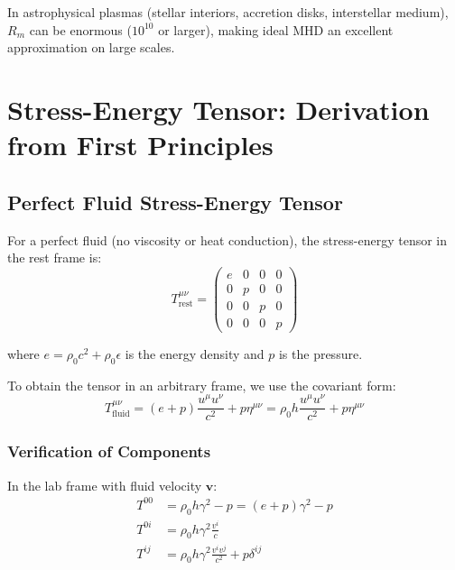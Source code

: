 \documentclass[12pt,a4paper]{article}
\begin{document}
In astrophysical plasmas (stellar interiors, accretion disks, interstellar medium),
$R_m$ can be enormous ($10^{10}$ or larger), making ideal MHD an excellent approximation
on large scales.

\section{Stress-Energy Tensor: Derivation from First Principles}

\subsection{Perfect Fluid Stress-Energy Tensor}

For a perfect fluid (no viscosity or heat conduction), the stress-energy tensor
in the rest frame is:
\begin{equation}
T^{\mu\nu}_\text{rest} = \begin{pmatrix}
e & 0 & 0 & 0 \\
0 & p & 0 & 0 \\
0 & 0 & p & 0 \\
0 & 0 & 0 & p
\end{pmatrix}
\label{eq:Tmunu_rest}
\end{equation}

where $e = \rho_0 c^2 + \rho_0 \epsilon$ is the energy density and $p$ is the pressure.

To obtain the tensor in an arbitrary frame, we use the covariant form:
\begin{equation}
T^{\mu\nu}_\text{fluid} = (e + p)\frac{u^\mu u^\nu}{c^2} + p \eta^{\mu\nu}
= \rho_0 h \frac{u^\mu u^\nu}{c^2} + p \eta^{\mu\nu}
\label{eq:Tmunu_fluid}
\end{equation}

\subsubsection{Verification of Components}

In the lab frame with fluid velocity $\bm{v}$:
\begin{align}
T^{00} &= \rho_0 h \gamma^2 - p = (e + p)\gamma^2 - p \label{eq:T00_fluid} \\
T^{0i} &= \rho_0 h \gamma^2 \frac{v^i}{c} \label{eq:T0i_fluid} \\
T^{ij} &= \rho_0 h \gamma^2 \frac{v^i v^j}{c^2} + p\delta^{ij} \label{eq:Tij_fluid}
\end{align}
\end{document}

